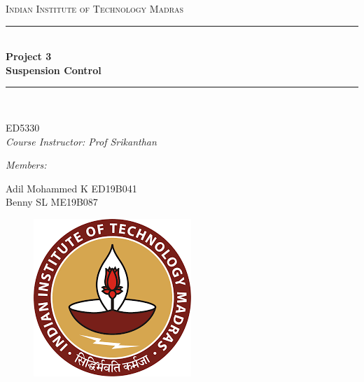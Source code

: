 \documentclass[12pt, a4paper, oneside]{report}
\begin{document}
\begin{titlepage}

\newcommand{\HRule}{\rule{\linewidth}{0.5mm}} %

\center %
 


\textsc{\large Indian Institute of Technology Madras}\\[0.5cm]

\HRule \\[0.8cm]
{ \large \bfseries Project 3}\\[0.4cm]
{ \large \bfseries Suspension Control}\\[0.2cm]
\HRule \\[1.5cm]
 

\begin{minipage}{0.8\textwidth}
\begin{center} \large
{ED5330}\\
\emph{Course Instructor: Prof Srikanthan }\\


\end{center}



\end{minipage}

\bigskip
\bigskip

\emph{Members: }\\
\begin{center} \large
    Adil Mohammed K ED19B041\\
    Benny SL ME19B087 \\
    
   
    
    
\end{center}

\begin{figure}[h]
\centerline{\includegraphics[scale=0.6]{logo_iitm.png}}


\end{figure}
\end{titlepage}
\end{document}
